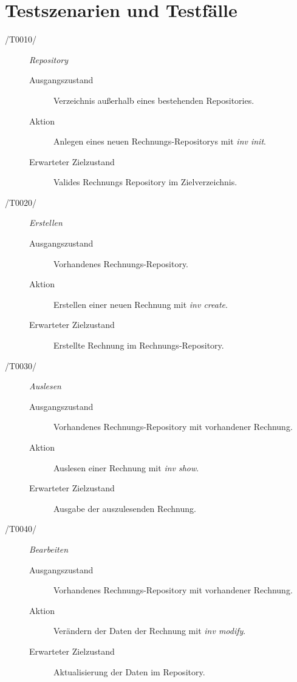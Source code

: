 
\section{Testszenarien und Testfälle}



\begin{description}
  \item[/T0010/]
	\textit{Repository}
	\begin{description}
		\item[Ausgangszustand]
		Verzeichnis außerhalb eines bestehenden Repositories.
		\item[Aktion]
		Anlegen eines neuen Rechnungs-Repositorys mit \textit{inv init}.
		\item[Erwarteter Zielzustand]
		Valides Rechnungs Repository im Zielverzeichnis.
	\end{description}

  \item[/T0020/]
	\textit{Erstellen}
	\begin{description}
		\item[Ausgangszustand]
		Vorhandenes Rechnungs-Repository.
		\item[Aktion]
		Erstellen einer neuen Rechnung mit \textit{inv create}.
		\item[Erwarteter Zielzustand]
		Erstellte Rechnung im Rechnungs-Repository.
	\end{description}

  \item[/T0030/]
	\textit{Auslesen}
	\begin{description}
		\item[Ausgangszustand]
		Vorhandenes Rechnungs-Repository mit vorhandener Rechnung.
		\item[Aktion]
		Auslesen einer Rechnung mit \textit{inv show}.
		\item[Erwarteter Zielzustand]
		Ausgabe der auszulesenden Rechnung.
	\end{description}

  \item[/T0040/]
	\textit{Bearbeiten}
	\begin{description}
		\item[Ausgangszustand]
		Vorhandenes Rechnungs-Repository mit vorhandener Rechnung.
		\item[Aktion]
		Verändern der Daten der Rechnung mit \textit{inv modify}.
		\item[Erwarteter Zielzustand]
		Aktualisierung der Daten im Repository.
	\end{description}


\end{description}
